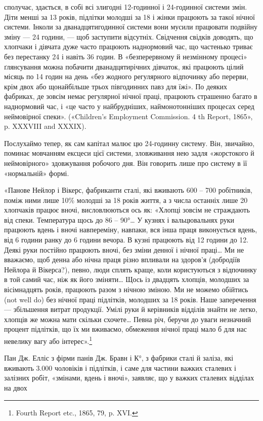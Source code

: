 {сполучає, здається, в собі всі злигодні 12-годинної і 24-годинної системи
змін. Діти менші за 13 років, підлітки молодші за 18 і жінки працюють
за такої нічної системи. Інколи за дванадцятигодинної системи вони
мусили працювати подвійну зміну — 24 години, — щоб заступити відсутніх.
Свідчення свідків доводять, що хлопчаки і дівчата дуже часто працюють
наднормовий час, що частенько триває без перестанку 24 і навіть 36 годин.
В «безперервному й незмінному процесі» ґлянсування можна побачити
дванадцятирічних дівчаток, які працюють цілий місяць по 14 годин на
день «без жодного регулярного відпочинку або перерви, крім двох або
щонайбільше трьох півгодинних павз для їжі». По деяких фабриках, де
зовсім немає регулярної нічної праці, працюють страшенно багато в наднормовий
час, і «це часто у найбрудніших, наймонотонніших процесах
серед неймовірної спеки». («Children’s Employment Commission. 4 th
Report, 1865», p. XXXVIII and XXXIX).
}

Послухаймо тепер, як сам капітал малює цю 24-годинну
систему. Він, звичайно, поминає мовчанням ексцеси цієї системи,
зловживання нею задля «жорстокого й неймовірного» здовжування
робочого дня. Він говорить лише про систему в її «нормальній»
формі.

«Панове Нейлор і Вікерс, фабриканти сталі, які вживають
600 – 700 робітників, поміж ними лише 10\% молодші за 18 років
життя, а з числа останніх лише 20 хлопчаків працює вночі,
висловлюються ось як: «Хлопці зовсім не страждають від спеки.
Температура щось до 86 – 90°\dots{} У кузнях і вальцювальнях
руки працюють вдень і вночі навпереміну, навпаки, вся інша
праця виконується вдень, від 6 години ранку до 6 години вечора.
В кузні працюють від 12 години до 12. Деякі руки постійно працюють
вночі, без зміни денної і нічної праці\dots{} Ми не вважаємо,
щоб денна або нічна праця різно впливали на здоров’я (добродіїв
Нейлора й Вікерса?), певно, люди сплять краще, коли користуються
з відпочинку в той самий час, ніж як його зміняти\dots{}
Щось із двадцять хлопців, молодших за вісімнадцять років,
працюють разом з нічною зміною. Ми не можемо обійтись (not
well do) без нічної праці підлітків, молодших за 18 років. Наше
заперечення — збільшення витрат продукції. Умілі руки й
керівників відділів знайти не легко, хлопців же можна мати
скільки схочете\dots{} Певна річ, беручи до уваги незначний процент
підлітків, що їх ми вживаємо, обмеження нічної праці мало б
для нас невелику вагу або інтерес».\footnote{
Fourth Report etc., 1865, 79, p. XVI.
}

Пан Дж. Елліс з фірми панів Дж. Бравн і К°, з фабрики
сталі й заліза, які вживають \num{3.000} чоловіків і підлітків,
і саме для частини важких сталевих і залізних робіт, «змінами,
вдень і вночі», заявляє, що у важких сталевих відділах на двох
\parbreak{}  %
